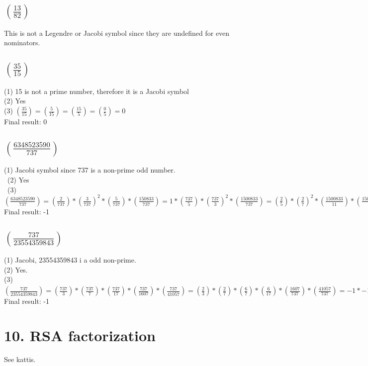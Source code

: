 \documentclass[a4paper,11pt]{article}
\def\lag[#1]#2{\left(\frac{#1}{#2}\right) }
\begin{document}
	\subsection*{$\lag[13]{82}$}
		This is not a Legendre or Jacobi symbol since they are undefined for even nominators.
	\subsection*{$\lag[35]{15}$}
		(1) 15 is not a prime number, therefore it is a Jacobi symbol\\
		(2) Yes\\
		(3) $\lag[35]{15} = \lag[5]{15} = \lag[15]{5} = \lag[0]{5} = 0$\\
		Final result: 0
	\subsection*{$\lag[6348523590]{737}$}
		(1) Jacobi symbol since 737 is a non-prime odd number.\\\
		(2) Yes\\\
		(3) $\lag[6348523590]{737} = \lag[2]{737}*\lag[3]{737}^2*\lag[5]{737}*\lag[150833]{737} = 1 * \lag[737]{5} * \lag[737]{3}^2 * \lag[1500833]{737} = 
			\lag[2]{5}*\lag[2]{7}^2 * \lag[1500833]{11} * \lag[1500833]{67} = -1 * \lag[4]{11} * \lag[33]{67} = 
			-1 * \lag[11]{4} * \lag[67]{33} = -1 * \lag[3]{4}*\lag[1]{33} = -1 * 1 * \lag[1]{3} * \lag[1]{11} = -1 * 1 * 1 = -1$\\
			Final result: -1 
	\subsection*{$\lag[737]{23554359843}$}
		(1) Jacobi, 23554359843 i a odd non-prime.\\
		(2) Yes. \\
		(3) $\lag[737]{23554359843} = \lag[737]{3} * \lag[737]{7} * \lag[737]{17}*\lag[737]{1607}*\lag[737]{41057} = 
		\lag[2]{3} * \lag[2]{7} * \lag[6]{7} * \lag[6]{17} * \lag[1607]{737}*\lag[41057]{737} = 
		-1 * -1 * -1 * 1 * -1 * \lag[133]{737}*\lag[522]{737} =
		1 * \lag[7]{737} * \lag[19]{737} * \lag[2]{737} * \lag[3]{737}^2 * \lag[29]{737} = 
		1 * \lag[15]{19} * (-1)^2 * \lag[12]{29} = \lag[19]{15} * \lag[29]{12} = \lag[2]{15}^2 * \lag[15]{12} = 1 * 1 \lag[7]{12} = \lag[12]{7} = \lag[5]{7} = \lag[7]{5} = \lag[2]{5} = -1$\\
		Final result: -1\\

	\section*{10. RSA factorization}
		See kattis.
		 
		
\end{document}
